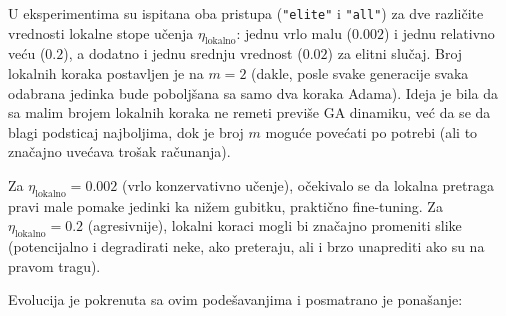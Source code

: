 \documentclass[a4paper,12pt]{article}
\begin{document}
U eksperimentima su ispitana oba pristupa (\texttt{"elite"} i \texttt{"all"}) za dve različite vrednosti lokalne stope učenja $\eta_{\text{lokalno}}$: jednu vrlo malu ($0.002$) i jednu relativno veću ($0.2$), a dodatno i jednu srednju vrednost ($0.02$) za elitni slučaj. Broj lokalnih koraka postavljen je na $m=2$ (dakle, posle svake generacije svaka odabrana jedinka bude poboljšana sa samo dva koraka Adama). Ideja je bila da sa malim brojem lokalnih koraka ne remeti previše GA dinamiku, već da se da blagi podsticaj najboljima, dok je broj $m$ moguće povećati po potrebi (ali to značajno uvećava trošak računanja).

Za $\eta_{\text{lokalno}} = 0.002$ (vrlo konzervativno učenje), očekivalo se da lokalna pretraga pravi male pomake jedinki ka nižem gubitku, praktično fine-tuning. Za $\eta_{\text{lokalno}} = 0.2$ (agresivnije), lokalni koraci mogli bi značajno promeniti slike (potencijalno i degradirati neke, ako preteraju, ali i brzo unaprediti ako su na pravom tragu).

Evolucija je pokrenuta sa ovim podešavanjima i posmatrano je ponašanje:
\end{document}
